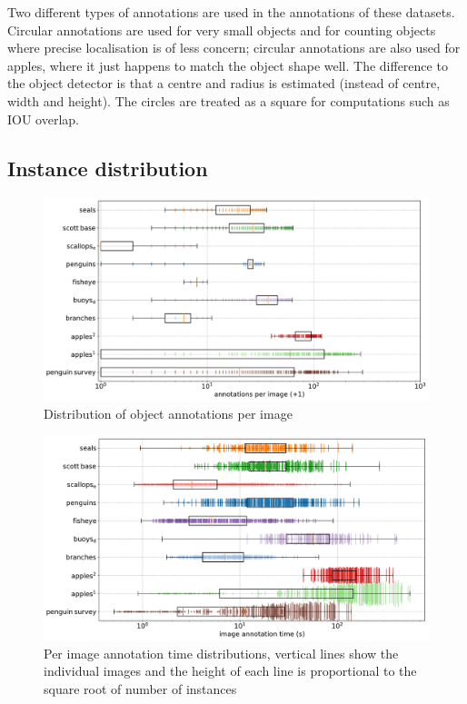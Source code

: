 Two different types of annotations are used in the annotations of these datasets. Circular annotations are used for very small objects and for counting objects where precise localisation is of less concern; circular annotations are also used for apples, where it just happens to match the object shape well. The difference to the object detector is that a centre and radius is estimated (instead of centre, width and height). The circles are treated as a square for computations such as \gls{IOU} overlap.

\subsection {Instance distribution}

\begin{figure}[ht!]
\centering
\includegraphics[width=1.0\linewidth]{charts/summaries/instances_boxplot.pdf}
\caption{ Distribution of object annotations per image }
\label{fig:instances_image_plot}
\end{figure}

\begin{figure}[ht]
\centering
\includegraphics[width=1.0\linewidth]{charts/summaries/duration_boxplot.pdf}
\caption{ Per image annotation time distributions, vertical lines show the individual images and the height of each line is proportional to the square root of number of instances }
\label{fig:duration_boxplot}
\end{figure}

